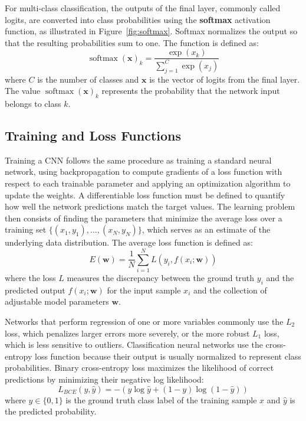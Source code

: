 For multi-class classification, the outputs of the final layer, commonly called logits, are converted into class probabilities using the \textbf{softmax} activation function, as illustrated in Figure~\ref{fig:softmax}. Softmax normalizes the output so that the resulting probabilities sum to one. The function is defined as:
\begin{equation}
    \operatorname{softmax}(\mathbf{x})_k = \frac{\exp (x_k)}{\sum_{j=1}^C \exp (x_j)}
\end{equation}
where $C$ is the number of classes and $\mathbf{x}$ is the vector of logits from the final layer. The value $\operatorname{softmax}(\mathbf{x})_k$ represents the probability that the network input belongs to class $k$.~\cite{Szeliski2022, Zhao2024}

\subsection{Training and Loss Functions}
Training a CNN follows the same procedure as training a standard neural network, using backpropagation to compute gradients of a loss function with respect to each trainable parameter and applying an optimization algorithm to update the weights. A differentiable loss function must be defined to quantify how well the network predictions match the target values. The learning problem then consists of finding the parameters that minimize the average loss over a training set $\{(x_1, y_1), \dotsc, (x_N, y_N)\}$, which serves as an estimate of the underlying data distribution. The average loss function is defined as:
\begin{equation}
    E(\mathbf{w}) = \frac{1}{N} \sum_{i = 1}^N L(y_i, f(x_i; \mathbf{w}))
\end{equation}
where the loss $L$ measures the discrepancy between the ground truth $y_i$ and the predicted output $f(x_i; \mathbf{w})$ for the input sample $x_i$ and the collection of adjustable model parameters $\mathbf{w}$.~\cite{Szeliski2022, Lecun1998}

Networks that perform regression of one or more variables commonly use the $L_2$ loss, which penalizes larger errors more severely, or the more robust $L_1$ loss, which is less sensitive to outliers. Classification neural networks use the cross-entropy loss function because their output is usually normalized to represent class probabilities. Binary cross-entropy loss maximizes the likelihood of correct predictions by minimizing their negative log likelihood:
\begin{equation}
    L_{BCE}(y, \hat{y}) = -(y\log\hat{y} + (1 - y)\log(1 - \hat{y}))
\end{equation}
where $y \in \{0, 1\}$ is the ground truth class label of the training sample $x$ and $\hat{y}$ is the predicted probability.

